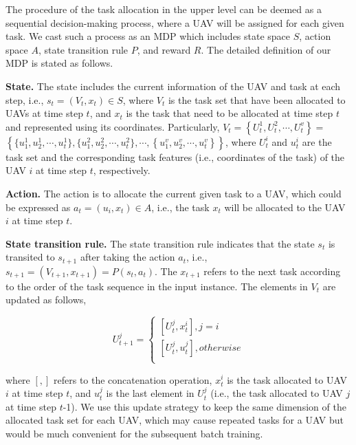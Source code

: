 \documentclass[lettersize,journal]{IEEEtran}
\begin{document}
	The procedure of the task allocation in the upper level can be deemed as a sequential decision-making process, where a UAV will be assigned for each given task. We cast such a process as an MDP which includes state space $S$, action space $A$, state transition rule $P$, and reward $R$. The detailed definition of our MDP is stated as follows.
	
	\textbf{State.} The state includes the current information of the UAV and task at each step, i.e., ${{s}_{t}}=\left( {{V}_{t}},{{x}_{t}} \right)\in S$, where ${{V}_{t}}$ is the task set that have been allocated to UAVs at time step $t$, and ${{x}_{t}}$ is the task that need to be allocated at time step $t$ and represented using its coordinates. Particularly, ${{V}_{t}}=\left\{ U_{t}^{1},U_{t}^{2},\cdots ,U_{t}^{v} \right\}=$ $\left\{ \{ u_{1}^{1},u_{2}^{1},\cdots ,u_{t}^{1} \},\{ u_{1}^{2},u_{2}^{2},\cdots ,u_{t}^{2} \},\cdots, \left\{ u_{1}^{v},u_{2}^{v},\cdots ,u_{t}^{v} \right\} \right\}$, where $U_{t}^{i}$ and ${u_{t}^{i}}$ are the task set and the corresponding task features (i.e., coordinates of the task) of the UAV $i$ at time step $t$, respectively. %
	
	\textbf{Action.} The action is to allocate the current given task to a UAV, which could be expressed as ${{a}_{t}}=\left( {{u}_{i}},{{x}_{t}} \right)\in A$, i.e., the task ${{x}_{t}}$ will be allocated to the UAV $i$ at time step $t$.
	
	\textbf{State transition rule.} The state transition rule indicates that the state ${{s}_{t}}$ is transited to ${{s}_{t+1}}$ after taking the action ${{a}_{t}}$, i.e., ${{s}_{t+1}}=\left( {{V}_{t+1}},{{x}_{t+1}} \right)=P\left( {{s}_{t}},{{a}_{t}} \right)$. The ${x}_{t+1}$ refers to the next task according to the order of the task sequence in the input instance. The elements in ${{V}_{t}}$ are updated as follows,
	
	\begin{small}
		\begin{equation}\label{state transition rule}
			U_{t+1}^{j}=\left\{ \begin{array}{*{35}{l}}
				\left[ U_{t}^{j},x_{t}^{i} \right],j=i  \\
				\left[ U_{t}^{j},u_{t}^{j} \right],otherwise  \\
			\end{array} \right.
		\end{equation}
	\end{small}
	where $\left[ , \right]$ refers to the concatenation operation, $x_{t}^{i}$ is the task allocated to UAV $i$ at time step $t$, and $u_{t}^{j}$ is the last element in $U_{t}^{j}$ (i.e., the task allocated to UAV $j$ at time step $t$-1). We use this update strategy to keep the same dimension of the allocated task set for each UAV, which may cause repeated tasks for a UAV but would be much convenient for the subsequent batch training.
	
\end{document}
